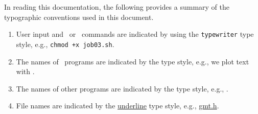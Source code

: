 In reading this documentation, the following provides a summary of
the typographic conventions used in this document.

\begin{enumerate}

\item User input and \GMT\ or \UNIX\ commands are indicated by
using the \texttt{typewriter} type style, e.g., \texttt{chmod +x job03.sh}.

\item The names of \GMT\ programs are indicated by the
 type style, e.g., we plot text with .

\item The names of other programs are indicated by the
 type style, e.g., .

\item File names are indicated by the \underline{underline}
type style, e.g., \underline{gmt.h}.

\end{enumerate}
